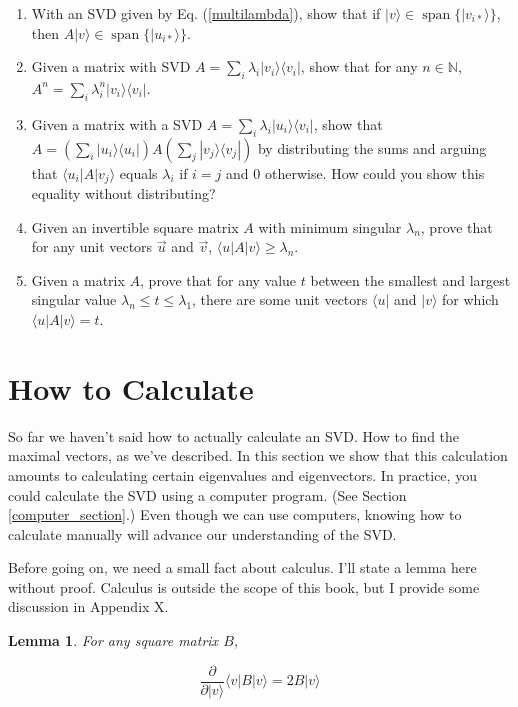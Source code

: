 \documentclass{amsbook}
\newtheorem{lemma}[theorem]{Lemma}
\begin{document}
\begin{enumerate}
\item With an SVD given by Eq. (\ref{multilambda}), show that if $|v\rangle\in\operatorname{span}\{|v_{i*}\rangle\}$, then $A|v\rangle\in\operatorname{span}\{|u_{i*}\rangle\}$.
\item Given a matrix with SVD $A=\sum_i\lambda_i|v_i\rangle\langle v_i|$, show that for any $n\in\mathbb N$, $A^n=\sum_i\lambda_i^n|v_i\rangle\langle v_i|$.
\item Given a matrix with a SVD $A=\sum_i\lambda_i|u_i\rangle\langle v_i|$, show that $A=\left(\sum_i|u_i\rangle\langle u_i|\right)A\left(\sum_j|v_j\rangle\langle v_j|\right)$ by distributing the sums and arguing that $\langle u_i|A|v_j\rangle$ equals $\lambda_i$ if $i=j$ and $0$ otherwise.  How could you show this equality without distributing?
\item Given an invertible square matrix $A$ with minimum singular $\lambda_n$, prove that for any unit vectors $\vec u$ and $\vec v$, $\langle u|A|v\rangle\geq\lambda_n$.
\item Given a matrix $A$, prove that for any value $t$ between the smallest and largest singular value $\lambda_n\leq t\leq\lambda_1$, there are some unit vectors $\langle u|$ and $|v\rangle$ for which $\langle u|A|v\rangle=t$.
\end{enumerate}

\section{How to Calculate}\label{How to Calculate}

So far we haven't said how to actually calculate an SVD.  How to find the maximal vectors, as we've described.  In this section we show that this calculation amounts to calculating certain eigenvalues and eigenvectors.  In practice, you could calculate the SVD using a computer program.  (See Section \ref{computer_section}.)  Even though we can use computers, knowing how to calculate manually will advance our understanding of the SVD.

Before going on, we need a small fact about calculus.  I'll state a lemma here without proof.  Calculus is outside the scope of this book, but I provide some discussion in Appendix X.

\begin{lemma}
\label{calc}
For any square matrix $B$,

$$
\frac{\partial}{\partial|v\rangle}\langle v|B|v\rangle = 2B|v\rangle
$$
\end{lemma}
\end{document}
